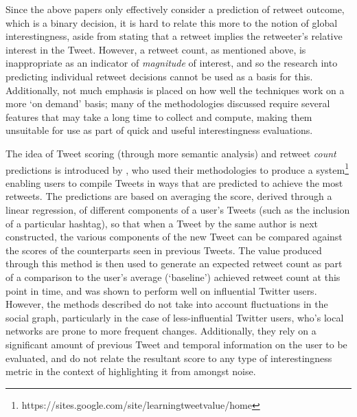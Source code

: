 Since the above papers only effectively consider a prediction of retweet outcome, which is a binary decision, it is hard to relate this more to the notion of global interestingness, aside from stating that a retweet implies the retweeter's relative interest in the Tweet. However, a retweet count, as mentioned above, is inappropriate as an indicator of \textit{magnitude} of interest, and so the research into predicting individual retweet decisions cannot be used as a basis for this. Additionally, not much emphasis is placed on how well the techniques work on a more `on demand' basis; many of the methodologies discussed require several features that may take a long time to collect and compute, making them unsuitable for use as part of quick and useful interestingness evaluations.

The idea of Tweet scoring (through more semantic analysis) and retweet \textit{count} predictions is introduced by \citet{gransee12}, who used their methodologies to produce a system\footnote{https://sites.google.com/site/learningtweetvalue/home} enabling users to compile Tweets in ways that are predicted to achieve the most retweets. The predictions are based on averaging the score, derived through a linear regression, of different components of a user's Tweets (such as the inclusion of a particular hashtag), so that when a Tweet by the same author is next constructed, the various components of the new Tweet can be compared against the scores of the counterparts seen in previous Tweets. The value produced through this method is then used to generate an expected retweet count as part of a comparison to the user's average (`baseline') achieved retweet count at this point in time, and was shown to perform well on influential Twitter users. However, the methods described do not take into account fluctuations in the social graph, particularly in the case of less-influential Twitter users, who's local networks are prone to more frequent changes. Additionally, they rely on a significant amount of previous Tweet and temporal information on the user to be evaluated, and do not relate the resultant score to any type of interestingness metric in the context of highlighting it from amongst noise.

